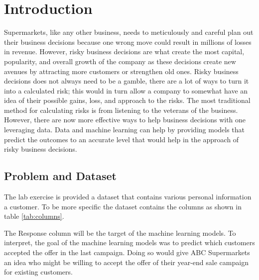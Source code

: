 \section{Introduction}


Supermarkets, like any other business, needs to meticulously and careful plan out their business decisions because one wrong move could result in millions of losses in revenue. However, risky business decisions are what create the most capital, popularity, and overall growth of the company as these decisions create new avenues by attracting more customers or strengthen old ones. Risky business decisions does not always need to be a gamble, there are a lot of ways to turn it into a calculated risk; this would in turn allow a company to somewhat have an idea of their possible gains, loss, and approach to the risks. The most traditional method for calculating risks is from listening to the veterans of the business. However, there are now more effective ways to help business decisions with one leveraging data. Data and machine learning can help by providing models that predict the outcomes to an accurate level that would help in the approach of risky business decisions. 

\subsection{Problem and Dataset}

The lab exercise is provided a dataset that contains various personal information a customer. To be more specific the dataset contains the columns as shown in table \ref{tab:columns}.

The Response column will be the target of the machine learning models. To interpret, the goal of the machine learning models was to predict which customers accepted the offer in the last campaign. Doing so would give ABC Supermarkets an idea who might be willing to accept the offer of their year-end sale campaign for existing customers. 

